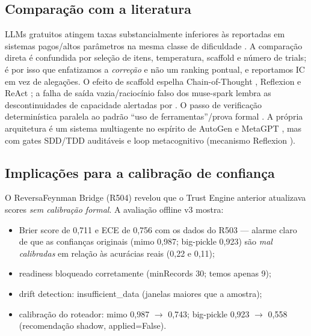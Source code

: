 \subsection{Comparação com a literatura}
\label{sec:comparacao}
LLMs gratuitos atingem taxas substancialmente inferiores às reportadas em
sistemas pagos/altos parâmetros na mesma classe de dificuldade
\citep{hendrycks_math,cobbe_gsm8k,hendrycks_mmlu}. A comparação direta é
confundida por seleção de itens, temperatura, scaffold e número de trials;
é por isso que enfatizamos a \emph{correção} e não um ranking pontual, e
reportamos IC em vez de alegações. O efeito de scaffold espelha
Chain-of-Thought \citep{wei_cot}, Reflexion \citep{shinn_reflexion} e ReAct
\citep{yao_react}; a falha de saída vazia/raciocínio falso dos muse-spark
lembra as descontinuidades de capacidade alertadas por
\citet{schaeffer_mirage}. O passo de verificação determinística paralela ao
padrão ``uso de ferramentas''/prova formal \citep{yang_leandojo,alpha_geometry}.
A própria arquitetura é um sistema multiagente no espírito de AutoGen
\citep{wu_autogen} e MetaGPT \citep{hong_metagpt}, mas com gates SDD/TDD
auditáveis e loop metacognitivo (mecanismo Reflexion
\citep{shinn_reflexion}).

\subsection{Implicações para a calibração de confiança}
\label{sec:calibracao}
O ReversaFeynman Bridge (R504) revelou que o Trust Engine anterior
atualizava scores \emph{sem calibração formal}. A avaliação offline v3
mostra:
\begin{itemize}
  \item Brier score de 0,711 e ECE de 0,756 com os dados do R503 --- alarme
  claro de que as confianças originais (mimo 0,987; big-pickle 0,923) são
  \emph{mal calibradas} em relação às acurácias reais (0,22 e 0,11);
  \item readiness bloqueado corretamente (minRecords 30; temos apenas 9);
  \item drift detection: insufficient\_data (janelas maiores que a amostra);
  \item calibração do roteador: mimo 0,987 $\rightarrow$ 0,743; big-pickle
  0,923 $\rightarrow$ 0,558 (recomendação shadow, applied=False).
\end{itemize}

